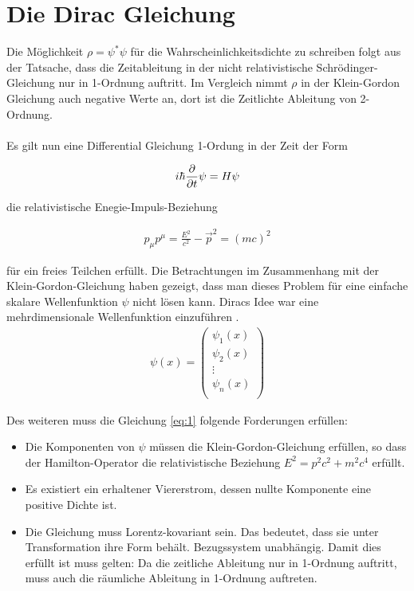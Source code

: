 
 





\section*{Die Dirac Gleichung}

 Die Möglichkeit \(\rho=\psi^*\psi\) für die Wahrscheinlichkeitsdichte zu schreiben folgt aus der Tatsache, dass die Zeitableitung in der nicht relativistische Schrödinger-Gleichung nur in 1-Ordnung auftritt. Im Vergleich nimmt \(\rho\) in der Klein-Gordon Gleichung auch negative Werte an, dort ist die Zeitlichte Ableitung von 2-Ordnung.\\
\\
Es gilt nun eine Differential Gleichung 1-Ordung in der Zeit der Form

\begin{align}
  \label{eq:1}
  i\hbar \pdiff_t \psi = H \psi
\end{align}

die relativistische Enegie-Impuls-Beziehung

\begin{align}
  \label{eq:2}
  p_\mu p^\mu = \frac{E^2}{c^2} - \vec p^2 = (mc)^2
\end{align}

für ein freies Teilchen erfüllt. Die Betrachtungen im Zusammenhang mit der Klein-Gordon-Gleichung haben gezeigt, dass man dieses Problem für eine einfache skalare Wellenfunktion \(\psi\) nicht lösen kann. Diracs Idee war eine mehrdimensionale Wellenfunktion einzuführen
.
\begin{align}
  \label{eq:3}
  \psi(x) = \begin{pmatrix}\psi_1(x)\\\psi_2(x)\\\vdots\\ \psi_n(x)\\ \end{pmatrix}
\end{align}

Des weiteren muss die Gleichung \eqref{eq:1} folgende Forderungen erfüllen:

\begin{itemize}
\item Die Komponenten von \(\psi\) müssen die Klein-Gordon-Gleichung erfüllen, so dass der Hamilton-Operator die relativistische Beziehung \(E^2 = p^2c^2+m^2c^4\) erfüllt.
\item Es existiert ein erhaltener Viererstrom, dessen nullte Komponente eine positive Dichte ist.
\item Die Gleichung muss Lorentz-kovariant sein. Das bedeutet, dass sie unter Transformation ihre Form behält. Bezugssystem unabhängig. Damit dies erfüllt ist muss gelten: Da die zeitliche Ableitung nur in 1-Ordnung auftritt, muss auch die räumliche Ableitung in 1-Ordnung auftreten. 
\end{itemize}

